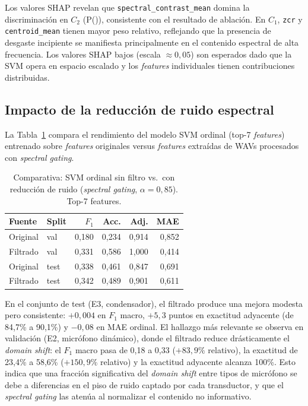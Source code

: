 \documentclass[10pt,twocolumn]{article}
\begin{document}
Los valores SHAP revelan que \texttt{spectral\_contrast\_mean} domina la
discriminación en $C_2$ (P()), consistente con el
resultado de ablación. En $C_1$, \texttt{zcr} y \texttt{centroid\_mean}
tienen mayor peso relativo, reflejando que la presencia de desgaste
incipiente se manifiesta principalmente en el contenido espectral de
alta frecuencia. Los valores SHAP bajos (escala $\approx 0{,}05$) son
esperados dado que la SVM opera en espacio escalado y los
\textit{features} individuales tienen contribuciones distribuidas.

\subsection{Impacto de la reducción de ruido espectral}
\label{sec:noise_results}

La Tabla~\ref{tab:noise_comparison} compara el rendimiento del modelo SVM
ordinal (top-7 \textit{features}) entrenado sobre \textit{features}
originales versus \textit{features} extraídas de WAVs procesados con
\textit{spectral gating}.

\begin{table}[htbp]
\centering
\caption{Comparativa: SVM ordinal sin filtro vs.\ con reducción de
  ruido (\textit{spectral gating}, $\alpha=0{,}85$). Top-7 features.}
\label{tab:noise_comparison}
\footnotesize
\begin{tabular}{@{}llrrrr@{}}
\toprule
Fuente & Split & {$F_1$} & {Acc.} & {Adj.} & {MAE} \\
\midrule
Original  & val  & 0{,}180 & 0{,}234 & 0{,}914 & 0{,}852 \\
Filtrado  & val  & 0{,}331 & 0{,}586 & 1{,}000 & 0{,}414 \\
\midrule
Original  & test & 0{,}338 & 0{,}461 & 0{,}847 & 0{,}691 \\
Filtrado  & test & 0{,}342 & 0{,}489 & 0{,}901 & 0{,}611 \\
\bottomrule
\end{tabular}
\end{table}

En el conjunto de test (E3, condensador), el filtrado produce una mejora
modesta pero consistente: $+0{,}004$ en $F_1$ macro, $+5{,}3$ puntos en
exactitud adyacente (de 84{,}7\% a 90{,}1\%) y $-0{,}08$ en MAE ordinal.
El hallazgo más relevante se observa en validación (E2, micrófono
dinámico), donde el filtrado reduce drásticamente el \textit{domain shift}:
el $F_1$ macro pasa de 0{,}18 a 0{,}33 ($+83{,}9\%$ relativo), la
exactitud de 23{,}4\% a 58{,}6\% ($+150{,}9\%$ relativo) y la exactitud
adyacente alcanza 100\%. Esto indica que una fracción significativa del
\textit{domain shift} entre tipos de micrófono se debe a diferencias en
el piso de ruido captado por cada transductor, y que el \textit{spectral
gating} las atenúa al normalizar el contenido no informativo.
\end{document}
